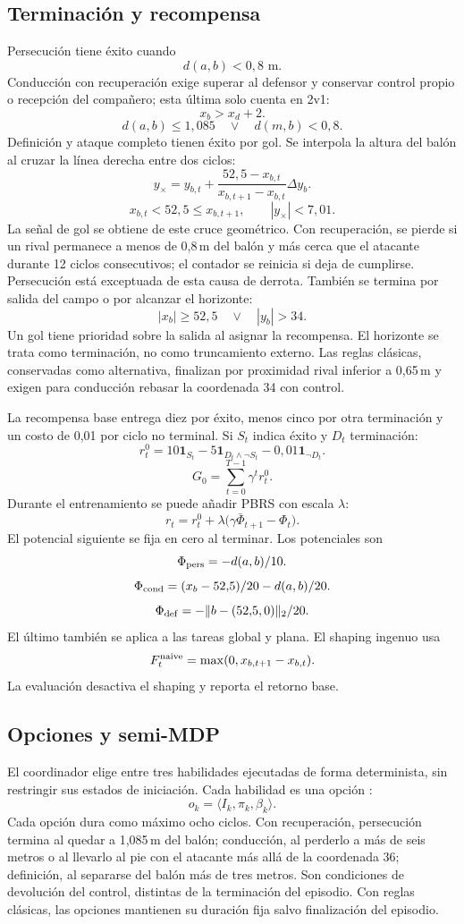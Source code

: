 \subsection{Terminación y recompensa}
Persecución tiene éxito cuando
\[
    d(a,b)<0{,}8\text{ m}.
\]
Conducción con recuperación exige superar al defensor y conservar control propio
o recepción del compañero; esta última solo cuenta en 2v1:
\[
    x_b>x_d+2.
\]
\[
    d(a,b)\leq1{,}085\quad\lor\quad d(m,b)<0{,}8.
\]
Definición y ataque completo tienen éxito por gol. Se interpola la altura
del balón al cruzar la línea derecha entre dos ciclos:
\[
    y_\times=y_{b,t}+\frac{52{,}5-x_{b,t}}{x_{b,t+1}-x_{b,t}}\Delta y_b.
\]
\[
    x_{b,t}<52{,}5\leq x_{b,t+1},\qquad |y_\times|<7{,}01.
\]
La señal de gol se obtiene de este cruce geométrico. Con recuperación, se pierde
si un rival permanece a menos de 0,8\,m del balón y más cerca que el atacante
durante 12 ciclos consecutivos; el contador se reinicia si deja de cumplirse.
Persecución está exceptuada de esta causa de derrota. También se termina por
salida del campo o por alcanzar el horizonte:
\[
    |x_b|\geq52{,}5\quad\lor\quad |y_b|>34.
\]
Un gol tiene prioridad sobre la salida al asignar la recompensa. El horizonte
se trata como terminación, no como truncamiento externo. Las reglas clásicas,
conservadas como alternativa, finalizan por proximidad rival inferior a 0,65\,m
y exigen para conducción rebasar la coordenada 34 con control.

La recompensa base entrega diez por éxito, menos cinco por otra terminación y
un costo de 0,01 por ciclo no terminal. Si $S_t$ indica éxito y $D_t$ terminación:
\[
    r_t^0=10\mathbf{1}_{S_t}-5\mathbf{1}_{D_t\land\neg S_t}-0{,}01\mathbf{1}_{\neg D_t}.
\]
\[
    G_0=\sum_{t=0}^{T-1}\gamma^t r_t^0.
\]
Durante el entrenamiento se puede añadir PBRS con escala $\lambda$:
\[
    r_t=r_t^0+\lambda\bigl(\gamma\bar\Phi_{t+1}-\Phi_t\bigr).
\]
El potencial siguiente se fija en cero al terminar. Los potenciales son
\[
    \Phi_{\rm pers}=-d(a,b)/10.
\]
\[
    \Phi_{\rm cond}=(x_b-52{,}5)/20-d(a,b)/20.
\]
\[
    \Phi_{\rm def}=-\lVert b-(52{,}5,0)\rVert_2/20.
\]
El último también se aplica a las tareas global y plana. El shaping ingenuo usa
\[
    F_t^{\rm naive}=\max(0,x_{b,t+1}-x_{b,t}).
\]
La evaluación desactiva el shaping y reporta el retorno base.

\subsection{Opciones y semi-MDP}
El coordinador elige entre tres habilidades ejecutadas de forma determinista,
sin restringir sus estados de iniciación. Cada habilidad es una opción
\cite{sutton1999options}:
\[
    o_k=\langle I_k,\pi_k,\beta_k\rangle.
\]
Cada opción dura como máximo ocho ciclos. Con recuperación, persecución termina
al quedar a 1,085\,m del balón; conducción, al perderlo a más de seis metros o al
llevarlo al pie con el atacante más allá de la coordenada 36; definición, al
separarse del balón más de tres metros. Son condiciones de devolución del control,
distintas de la terminación del episodio. Con reglas clásicas, las opciones
mantienen su duración fija salvo finalización del episodio.

